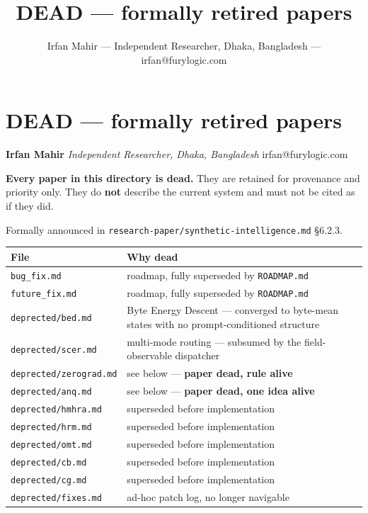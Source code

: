 \documentclass[
  11pt,
  a4paper,
]{article}
\title{DEAD --- formally retired papers}
\author{Irfan Mahir --- Independent Researcher, Dhaka, Bangladesh ---
irfan@furylogic.com}
\date{}
\begin{document}
\maketitle

{
\hypersetup{linkcolor=}
\setcounter{tocdepth}{3}
\tableofcontents
}
\section{DEAD --- formally retired
papers}\label{dead-formally-retired-papers}

\textbf{Irfan Mahir} \emph{Independent Researcher, Dhaka, Bangladesh}
irfan@furylogic.com

\textbf{Every paper in this directory is dead.} They are retained for
provenance and priority only. They do \textbf{not} describe the current
system and must not be cited as if they did.

Formally announced in \texttt{research-paper/synthetic-intelligence.md}
§6.2.3.

\begin{longtable}[]{@{}
  >{\raggedright\arraybackslash}p{}
  >{\raggedright\arraybackslash}p{}@{}}
\toprule\noalign{}
\begin{minipage}[b]{\linewidth}\raggedright
File
\end{minipage} & \begin{minipage}[b]{\linewidth}\raggedright
Why dead
\end{minipage} \\
\midrule\noalign{}
\endhead
\bottomrule\noalign{}
\endlastfoot
\texttt{bug\_fix.md} & roadmap, fully superseded by
\texttt{ROADMAP.md} \\
\texttt{future\_fix.md} & roadmap, fully superseded by
\texttt{ROADMAP.md} \\
\texttt{deprected/bed.md} & Byte Energy Descent --- converged to
byte-mean states with no prompt-conditioned structure \\
\texttt{deprected/scer.md} & multi-mode routing --- subsumed by the
field-observable dispatcher \\
\texttt{deprected/zerograd.md} & see below --- \textbf{paper dead, rule
alive} \\
\texttt{deprected/anq.md} & see below --- \textbf{paper dead, one idea
alive} \\
\texttt{deprected/hmhra.md} & superseded before implementation \\
\texttt{deprected/hrm.md} & superseded before implementation \\
\texttt{deprected/omt.md} & superseded before implementation \\
\texttt{deprected/cb.md} & superseded before implementation \\
\texttt{deprected/cg.md} & superseded before implementation \\
\texttt{deprected/fixes.md} & ad-hoc patch log, no longer navigable \\
\end{longtable}
\end{document}
